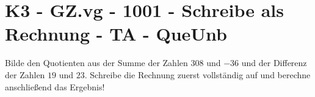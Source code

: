 \section{K3 - GZ.vg - 1001 - Schreibe als Rechnung - TA - QueUnb}

\begin{beispiel}{0} %
				Bilde den Quotienten aus der Summe der Zahlen $308$ und $-36$ und der Differenz der Zahlen $19$ und $23$. Schreibe die Rechnung zuerst vollständig auf und berechne anschließend das Ergebnis!
				
\end{beispiel}